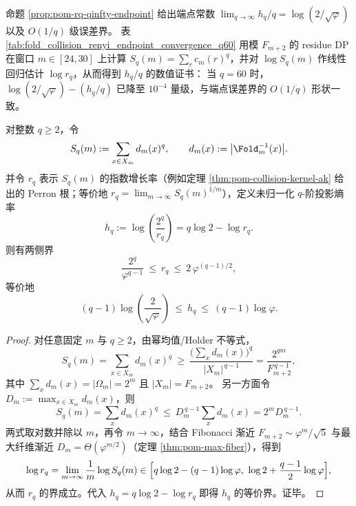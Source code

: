 \begin{remark}[端点收敛速度（可复核）：\texorpdfstring{$q\le 60$}{q<=60} 时 \texorpdfstring{$h_q/q\to\log(2/\sqrt{\varphi})$}{hq/q->log(2/sqrt(phi))}]\label{rem:pom-renyi-endpoint-q60}
命题 \ref{prop:pom-rq-qinfty-endpoint} 给出端点常数
\(
\lim_{q\to\infty}h_q/q=\log(2/\sqrt{\varphi})
\)
以及 \(O(1/q)\) 级误差界。
表 \ref{tab:fold_collision_renyi_endpoint_convergence_q60} 用模 \(F_{m+2}\) 的 residue DP 在窗口 \(m\in[24,30]\) 上计算 \(S_q(m)=\sum_r c_m(r)^q\)，并对 \(\log S_q(m)\) 作线性回归估计 \(\log r_q\)，从而得到 \(h_q/q\) 的数值证书：
当 \(q=60\) 时，\(\log(2/\sqrt{\varphi})-(h_q/q)\) 已降至 \(10^{-4}\) 量级，与端点误差界的 \(O(1/q)\) 形状一致。
\end{remark}


\begin{proposition}\label{prop:pom-rq-universal-bounds}
对整数 \(q\ge 2\)，令
$$
S_q(m):=\sum_{x\in X_m} d_m(x)^q,\qquad d_m(x):=\bigl|\Fold_m^{-1}(x)\bigr|.
$$
并令 \(r_q\) 表示 \(S_q(m)\) 的指数增长率（例如定理 \ref{thm:pom-collision-kernel-ak} 给出的 Perron 根；等价地 \(r_q=\lim_{m\to\infty}S_q(m)^{1/m}\)），定义未归一化 \(q\)-阶投影熵率
$$
h_q:=\log\!\left(\frac{2^q}{r_q}\right)=q\log 2-\log r_q.
$$
则有两侧界
$$
\frac{2^q}{\varphi^{q-1}}\ \le\ r_q\ \le\ 2\,\varphi^{(q-1)/2},
$$
等价地
$$
(q-1)\log\!\left(\frac{2}{\sqrt{\varphi}}\right)\ \le\ h_q\ \le\ (q-1)\log\varphi.
$$
\end{proposition}
\begin{proof}
对任意固定 \(m\) 与 \(q\ge 2\)，由幂均值/Holder 不等式，
$$
S_q(m)=\sum_{x\in X_m}d_m(x)^q\ \ge\ \frac{\bigl(\sum_x d_m(x)\bigr)^q}{|X_m|^{\,q-1}}
=\frac{2^{qm}}{F_{m+2}^{\,q-1}},
$$
其中 \(\sum_x d_m(x)=|\Omega_m|=2^m\) 且 \(|X_m|=F_{m+2}\)。
另一方面令 \(D_m:=\max_{x\in X_m} d_m(x)\)，则
$$
S_q(m)=\sum_x d_m(x)^q\ \le\ D_m^{\,q-1}\sum_x d_m(x)=2^m D_m^{\,q-1}.
$$
两式取对数并除以 \(m\)，再令 \(m\to\infty\)，结合 Fibonacci 渐近 \(F_{m+2}\sim \varphi^{m}/\sqrt5\) 与最大纤维渐近 \(D_m=\Theta(\varphi^{m/2})\)（定理 \ref{thm:pom-max-fiber}），得到
$$
\log r_q=\lim_{m\to\infty}\frac{1}{m}\log S_q(m)\in\Bigl[q\log 2-(q-1)\log\varphi,\ \log 2+\frac{q-1}{2}\log\varphi\Bigr],
$$
从而 \(r_q\) 的界成立。代入 \(h_q=q\log 2-\log r_q\) 即得 \(h_q\) 的等价界。证毕。
\end{proof}

